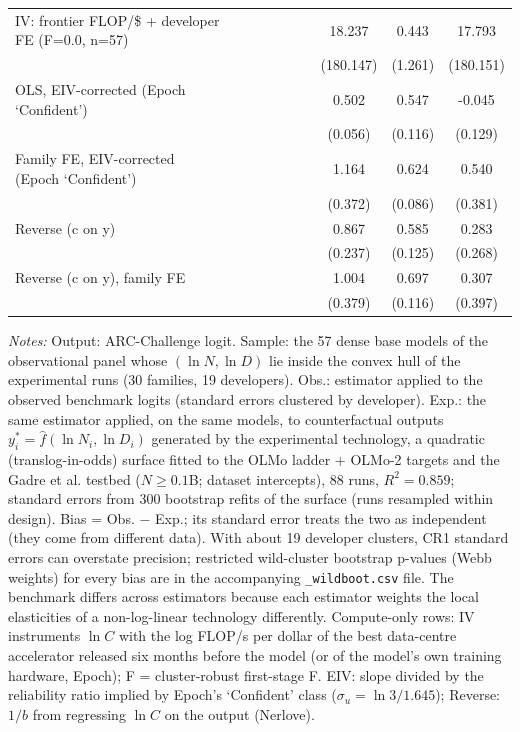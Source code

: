 \begin{table}[!htbp]
\begin{threeparttable}
\begin{tabular}{lccccccccc}
IV: frontier FLOP/\$ + developer FE (F=0.0, n=57) &  &  &  &  &  &  & 18.237 & 0.443 & 17.793 \\
 &  &  &  &  &  &  & (180.147) & (1.261) & (180.151) \\
OLS, EIV-corrected (Epoch `Confident') &  &  &  &  &  &  & 0.502 & 0.547 & -0.045 \\
 &  &  &  &  &  &  & (0.056) & (0.116) & (0.129) \\
Family FE, EIV-corrected (Epoch `Confident') &  &  &  &  &  &  & 1.164 & 0.624 & 0.540 \\
 &  &  &  &  &  &  & (0.372) & (0.086) & (0.381) \\
Reverse (c on y) &  &  &  &  &  &  & 0.867 & 0.585 & 0.283 \\
 &  &  &  &  &  &  & (0.237) & (0.125) & (0.268) \\
Reverse (c on y), family FE &  &  &  &  &  &  & 1.004 & 0.697 & 0.307 \\
 &  &  &  &  &  &  & (0.379) & (0.116) & (0.397) \\
\bottomrule
\end{tabular}
\begin{tablenotes}[flushleft]
\footnotesize
\item \textit{Notes:} Output: ARC-Challenge logit. Sample: the 57 dense base models of the observational panel whose $(\ln N,\ln D)$ lie inside the convex hull of the experimental runs (30 families, 19 developers). Obs.: estimator applied to the observed benchmark logits (standard errors clustered by developer). Exp.: the same estimator applied, on the same models, to counterfactual outputs $y^*_i=\hat f(\ln N_i,\ln D_i)$ generated by the experimental technology, a quadratic (translog-in-odds) surface fitted to the OLMo ladder + OLMo-2 targets and the Gadre et al. testbed ($N\geq0.1$B; dataset intercepts), 88 runs, $R^2=0.859$; standard errors from 300 bootstrap refits of the surface (runs resampled within design). Bias = Obs. $-$ Exp.; its standard error treats the two as independent (they come from different data). With about 19 developer clusters, CR1 standard errors can overstate precision; restricted wild-cluster bootstrap p-values (Webb weights) for every bias are in the accompanying \texttt{\_wildboot.csv} file. The benchmark differs across estimators because each estimator weights the local elasticities of a non-log-linear technology differently. Compute-only rows: IV instruments $\ln C$ with the log FLOP/s per dollar of the best data-centre accelerator released six months before the model (or of the model's own training hardware, Epoch); F = cluster-robust first-stage F. EIV: slope divided by the reliability ratio implied by Epoch's `Confident' class ($\sigma_u=\ln 3/1.645$); Reverse: $1/b$ from regressing $\ln C$ on the output (Nerlove).
\end{tablenotes}
\end{threeparttable}
\end{table}
